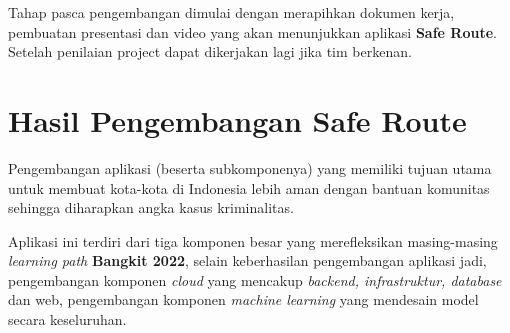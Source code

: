 Tahap pasca pengembangan dimulai dengan merapihkan dokumen kerja, pembuatan presentasi dan video yang akan menunjukkan aplikasi \textbf{Safe Route}. Setelah penilaian project dapat dikerjakan lagi jika tim berkenan.

\section{Hasil Pengembangan Safe Route}

Pengembangan aplikasi (beserta subkomponenya) yang memiliki tujuan utama untuk membuat kota-kota di Indonesia lebih aman dengan bantuan komunitas sehingga diharapkan angka kasus kriminalitas.

Aplikasi ini terdiri dari tiga komponen besar yang merefleksikan masing-masing \textit{learning path} \textbf{Bangkit 2022}, selain keberhasilan pengembangan aplikasi jadi, pengembangan komponen \textit{cloud} yang mencakup \textit{backend, infrastruktur, database} dan web, pengembangan komponen \textit{machine learning} yang mendesain model secara keseluruhan.
